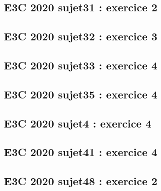 \documentclass[lang=fr,edition=teacher,layout=sheet]{mxbook}
\begin{document}
\begingroup\endgroup
\par\bigskip
{}\subsection*{E3C 2020 sujet31 : exercice 2}
\begingroup\endgroup
\par\bigskip
{}\subsection*{E3C 2020 sujet32 : exercice 3}
\begingroup\endgroup
\par\bigskip
{}\subsection*{E3C 2020 sujet33 : exercice 4}
\begingroup\endgroup
\par\bigskip
{}\subsection*{E3C 2020 sujet35 : exercice 4}
\begingroup\endgroup
\par\bigskip
{}\subsection*{E3C 2020 sujet4 : exercice 4}
\begingroup\endgroup
\par\bigskip
{}\subsection*{E3C 2020 sujet41 : exercice 4}
\begingroup\endgroup
\par\bigskip
{}\subsection*{E3C 2020 sujet48 : exercice 2}
\begingroup\endgroup
\end{document}
